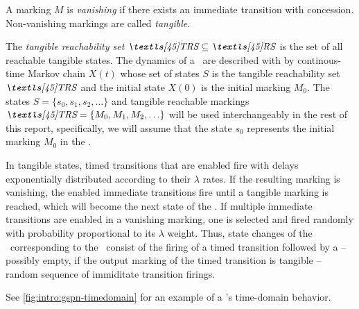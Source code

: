 \begin{dfn}
  A marking $M$ is \emph{vanishing} if there exists an immediate
  transition with concession. Non-vanishing markings are called
  \emph{tangible}.
\end{dfn}

The \emph{tangible reachability set} $\TRS \subseteq \RS$ is the set
of all reachable tangible states. The dynamics of a \gspn\ are
described with by continous-time Markov chain $X(t)$ whose set of
states $S$ is the tangible reachability set $\TRS$ and the initial
state $X(0)$ is the initial marking $M_0$. The states
$S = \{s_0, s_1, s_2, \ldots\}$ and tangible reachable markings
$\TRS = \{M_0, M_1, M_2, \ldots\}$ will be used interchangeably in the
rest of this report, specifically, we will assume that the state $s_0$
represents the initial marking $M_0$ in the \ctmc.

In tangible states, timed transitions that are enabled fire with
delays exponentially distributed according to their $\lambda$
rates. If the resulting marking is vanishing, the enabled immediate
transitions fire until a tangible marking is reached, which will
become the next state of the \ctmc. If multiple immediate transitions
are enabled in a vanishing marking, one is selected and fired randomly
with probability proportional to its $\lambda$ weight. Thus, state
changes of the \ctmc\ corresponding to the \gspn\ consist of the
firing of a timed transition followed by a -- possibly empty, if the
output marking of the timed transition is tangible -- random sequence
of immiditate transition firings.

See \vref{fig:intro:gspn-timedomain} for an example of a \gspn
's time-domain behavior.

